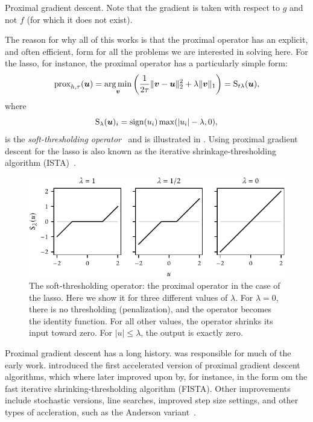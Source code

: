 \begin{algorithm}[hbtp]
  \caption{Proximal gradient descent. Note that the gradient is taken with respect to \(g\) and not \(f\) (for which it does not exist).}
  \label{alg:pgd}
\end{algorithm}

The reason for why all of this works is that the proximal operator has an explicit, and often efficient, form for all the problems we are interested in solving here. For the lasso, for instance, the proximal operator has a particularly simple form:
\[
  \operatorname{prox}_{h,\tau}(\boldsymbol{u})  = \operatorname*{arg\,min}_{\boldsymbol{v}} \left( \frac{1}{2\tau}\lVert \boldsymbol{v} - \boldsymbol{u}\rVert_2^2 + \lambda \lVert \boldsymbol{v} \rVert_1 \right)
  = \operatorname{S}_{t\lambda}(\boldsymbol{u}),
\]
where
\[
  \operatorname{S}_{\lambda}(\boldsymbol{u})_i = \operatorname{sign}(u_i)\max(\lvert u_i \rvert - \lambda, 0),
\]
is the \emph{soft-thresholding operator}~\parencite{donoho1995} and is illustrated in . Using proximal gradient descent for the lasso is also known as the iterative shrinkage-thresholding algorithm (ISTA)~\parencite{beck2009}.

\begin{figure}[htpb]
  \centering
  \includegraphics[]{figures/soft-thresholding.pdf}
  \caption{%
    The soft-thresholding operator: the proximal operator in the case of the lasso. Here we show it for three different values of \(\lambda\). For \(\lambda = 0\), there is no thresholding (penalization), and the operator becomes the identity function. For all other values, the operator shrinks its input toward zero. For \(|u| \leq \lambda\), the output is exactly zero.
  }
  \label{fig:soft-thresholding}
\end{figure}

Proximal gradient descent has a long history. \textcite{rockafellar1970} was responsible for much of the early work. \textcite{nesterov1983} introduced the first accelerated version of proximal gradient descent algorithms, which where later improved upon by, for instance, \textcite{beck2009} in the form om the fast iterative shrinking-thresholding algorithm (FISTA). Other improvements include stochastic versions, line searches, improved step size settings, and other types of accleration, such as the Anderson variant~\parencite{mai2020}.

